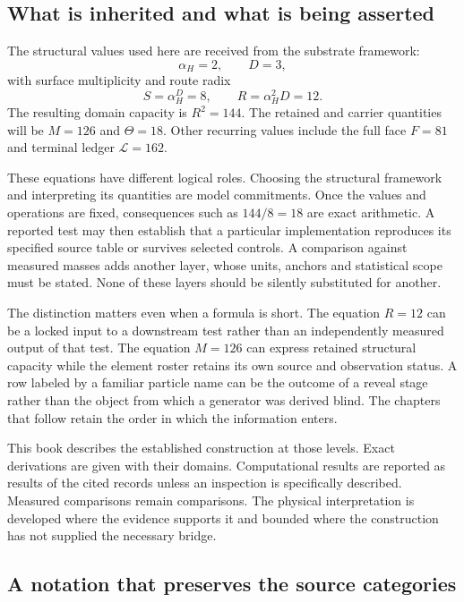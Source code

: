 \subsection{What is inherited and what is being asserted}

The structural values used here are received from the substrate framework:
\begin{equation}
\alpha_H=2,\qquad D=3,
\end{equation}
with surface multiplicity and route radix
\begin{equation}
S=\alpha_H^D=8,\qquad R=\alpha_H^2D=12.
\end{equation}
The resulting domain capacity is $R^2=144$. The retained and carrier quantities will be $M=126$ and $\Theta=18$. Other recurring values include the full face $F=81$ and terminal ledger $\mathcal L=162$.

These equations have different logical roles. Choosing the structural framework and interpreting its quantities are model commitments. Once the values and operations are fixed, consequences such as $144/8=18$ are exact arithmetic. A reported test may then establish that a particular implementation reproduces its specified source table or survives selected controls. A comparison against measured masses adds another layer, whose units, anchors and statistical scope must be stated. None of these layers should be silently substituted for another.

The distinction matters even when a formula is short. The equation $R=12$ can be a locked input to a downstream test rather than an independently measured output of that test. The equation $M=126$ can express retained structural capacity while the element roster retains its own source and observation status. A row labeled by a familiar particle name can be the outcome of a reveal stage rather than the object from which a generator was derived blind. The chapters that follow retain the order in which the information enters.

This book describes the established construction at those levels. Exact derivations are given with their domains. Computational results are reported as results of the cited records unless an inspection is specifically described. Measured comparisons remain comparisons. The physical interpretation is developed where the evidence supports it and bounded where the construction has not supplied the necessary bridge.

\subsection{A notation that preserves the source categories}

